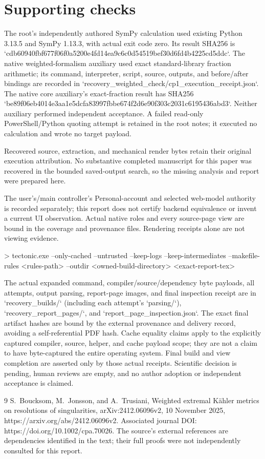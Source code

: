 \documentclass[10pt]{article}
\begin{document}
\section*{Supporting checks}
The root’s independently authored SymPy calculation used existing Python 3.13.5 and SymPy 1.13.3, with actual exit code zero. Its result SHA256 is `cdb60940fbf677f06f0a5200e4fd14ea9c6c0d54519bef30d6fd4b4225cd5ddc`. The native weighted-formalism auxiliary used exact standard-library fraction arithmetic; its command, interpreter, script, source, outputs, and before/after bindings are recorded in `recovery\_weighted\_check/cp1\_execution\_receipt.json`. The native core auxiliary’s exact-fraction result has SHA256 `be89f06eb4014e3aa1e5dcfa83997fbbe674f2d6e90f303c2031c6195436abd3`. Neither auxiliary performed independent acceptance. A failed read-only PowerShell/Python quoting attempt is retained in the root notes; it executed no calculation and wrote no target payload.\par
Recovered source, extraction, and mechanical render bytes retain their original execution attribution. No substantive completed manuscript for this paper was recovered in the bounded saved-output search, so the missing analysis and report were prepared here.\par
The user’s/main controller’s Personal-account and selected web-model authority is recorded separately; this report does not certify backend equivalence or invent a current UI observation. Actual native roles and every source-page view are bound in the coverage and provenance files. Rendering receipts alone are not viewing evidence.\par
> tectonic.exe –only-cached –untrusted –keep-logs –keep-intermediates –makefile-rules <rules-path> –outdir <owned-build-directory> <exact-report-tex>\par
The actual expanded command, compiler/source/dependency byte payloads, all attempts, output parsing, report-page images, and final inspection receipt are in `recovery\_builds/` (including each attempt’s `parsing/`), `recovery\_report\_pages/`, and `report\_page\_inspection.json`. The exact final artifact hashes are bound by the external provenance and delivery record, avoiding a self-referential PDF hash. Cache equality claims apply to the explicitly captured compiler, source, helper, and cache payload scope; they are not a claim to have byte-captured the entire operating system. Final build and view completion are asserted only by those actual receipts. Scientific decision is pending, human reviews are empty, and no author adoption or independent acceptance is claimed.\par
9 S. Boucksom, M. Jonsson, and A. Trusiani, Weighted extremal Kähler metrics on resolutions of singularities, arXiv:2412.06096v2, 10 November 2025, https://arxiv.org/abs/2412.06096v2. Associated journal DOI: https://doi.org/10.1002/cpa.70026. The source’s external references are dependencies identified in the text; their full proofs were not independently consulted for this report.\par
\end{document}
